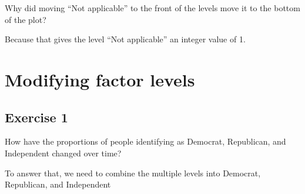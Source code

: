 \documentclass[]{book}
\newenvironment{Shaded}{\begin{snugshade}}{\end{snugshade}}
\newcommand{\CommentTok}[1]{\textcolor[rgb]{0.56,0.35,0.01}{\textit{#1}}}
\newcommand{\KeywordTok}[1]{\textcolor[rgb]{0.13,0.29,0.53}{\textbf{#1}}}
\newcommand{\NormalTok}[1]{#1}
\newcommand{\OperatorTok}[1]{\textcolor[rgb]{0.81,0.36,0.00}{\textbf{#1}}}
\theoremstyle{plain}
\theoremstyle{remark}
\theoremstyle{definition}
\theoremstyle{definition}
\theoremstyle{definition}
\theoremstyle{remark}
\begin{document}
Why did moving ``Not applicable'' to the front of the levels move it to
the bottom of the plot?

Because that gives the level ``Not applicable'' an integer value of 1.

\hypertarget{modifying-factor-levels}{%
\section{Modifying factor levels}\label{modifying-factor-levels}}

\hypertarget{exercise-1-45}{%
\subsection{Exercise 1}\label{exercise-1-45}}

How have the proportions of people identifying as Democrat, Republican,
and Independent changed over time?

To answer that, we need to combine the multiple levels into Democrat,
Republican, and Independent

\begin{Shaded}
\end{Shaded}
\end{document}
